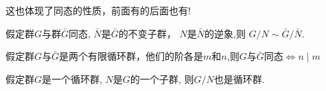 \begin{Remark}
这也体现了同态的性质，前面有的后面也有!
\end{Remark}

\begin{Proposition}
假定群$G$与群$\bar{G}$同态, $\bar{N}$是$\bar{G}$的不变子群， $N$是$\bar{N}$的逆象,则
$ G/N \sim \bar{G}/\bar{N} $.
\end{Proposition}

\begin{Proposition}
假定群$G$与$\bar{G}$是两个有限循环群，他们的阶各是$m$和$n$,则$G$与$\bar{G}$同态$\Leftrightarrow n \mid m$
\end{Proposition}

\begin{Proposition}
假定群$G$是一个循环群, $N$是$G$的一个子群, 则$G/N$也是循环群.
\end{Proposition}
